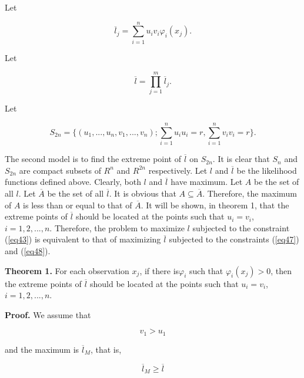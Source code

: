 \documentclass [18pt]{article}
\begin{document}
Let


\begin{equation}
\label{eq49}
\overline l _j = \sum\limits_{i = 1}^n {u_i v_i \varphi _i (x_j )} .
\end{equation}



Let


\begin{equation}
\label{eq50}
\overline l = \prod\limits_{j = 1}^m {\overline l _j } .
\end{equation}



Let


\begin{equation}
\label{eq51}
S_{2n} = \{(u_1 ,...,u_n ,v_1 ,...,v_n );\sum\limits_{i = 1}^n {u_i } u_i =
r,\sum\limits_{i = 1}^n {v_i } v_i = r\}.
\end{equation}



The second model is to find the extreme point of $\overline l $ on
$S_{2n} $. It is clear that $S_n $ and $S_{2n} $ are compact
subsets of $R^n$ and $R^{2n}$ respectively. Let $l$ and $\overline
l $ be the likelihood functions defined above. Clearly, both $l$
and $\overline l $ have maximum. Let $A$ be the set of all $l$.
Let $\overline A $ be the set of all $\overline l $. It is obvious
that $A \subseteq \overline A $. Therefore, the maximum of $A$ is
less than or equal to that of $\overline A $. It will be shown, in
theorem 1, that the extreme points of $\overline l $ should be
located at the points such that $u_i = v_i $, $i = 1,2,...,n$.
Therefore, the problem to maximize $l$ subjected to the constraint
(\ref{eq43}) is equivalent to that of maximizing $\overline l $
subjected to the constraints (\ref{eq47}) and (\ref{eq48}).

\textbf{Theorem 1. }For each observation $x_j $, if there
is\space$ \varphi _i $ such that $\varphi _i (x_j ) > 0$, then the
extreme points of $\overline l $ should be located at the points
such that $u_i = v_i $, $i = 1,2,...,n$.

\textbf{Proof. }We assume that


\begin{equation}
\label{eq52}
v_1 > u_1
\end{equation}



\noindent
and the maximum is $\overline l _M $, that is,


\begin{equation}
\label{eq53}
\overline l _M \ge \overline l
\end{equation}
\end{document}
